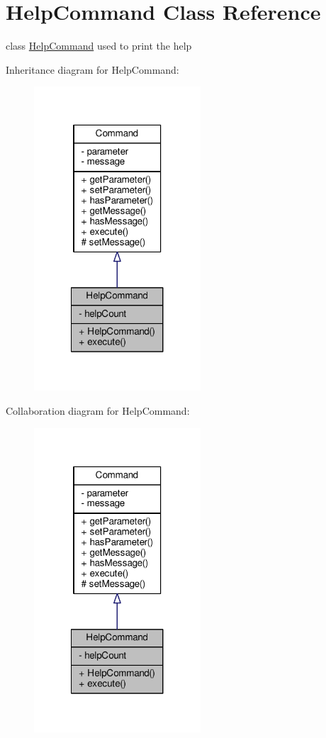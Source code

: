 \hypertarget{classHelpCommand}{\section{Help\-Command Class Reference}
\label{classHelpCommand}
}


class \hyperlink{classHelpCommand}{Help\-Command} used to print the help  




Inheritance diagram for Help\-Command\-:
\nopagebreak
\begin{figure}[H]
\begin{center}
\leavevmode
\includegraphics[width=176pt]{classHelpCommand__inherit__graph}
\end{center}
\end{figure}


Collaboration diagram for Help\-Command\-:
\nopagebreak
\begin{figure}[H]
\begin{center}
\leavevmode
\includegraphics[width=176pt]{classHelpCommand__coll__graph}
\end{center}
\end{figure}

